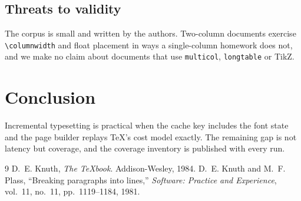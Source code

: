 \documentclass[10pt,twocolumn]{article}
\begin{document}
\subsection{Threats to validity}
The corpus is small and written by the authors. Two-column documents
exercise \texttt{\textbackslash columnwidth} and float placement in ways a
single-column homework does not, and we make no claim about documents that
use \texttt{multicol}, \texttt{longtable} or TikZ.

\section{Conclusion}
Incremental typesetting is practical when the cache key includes the font
state and the page builder replays TeX's cost model exactly. The remaining
gap is not latency but coverage, and the coverage inventory is published
with every run.

\begin{thebibliography}{9}
 D.~E. Knuth, \emph{The \TeX book}. Addison-Wesley, 1984.
 D.~E. Knuth and M.~F. Plass, ``Breaking paragraphs into
  lines,'' \emph{Software: Practice and Experience}, vol.~11, no.~11,
  pp.~1119--1184, 1981.
\end{thebibliography}
\end{document}
